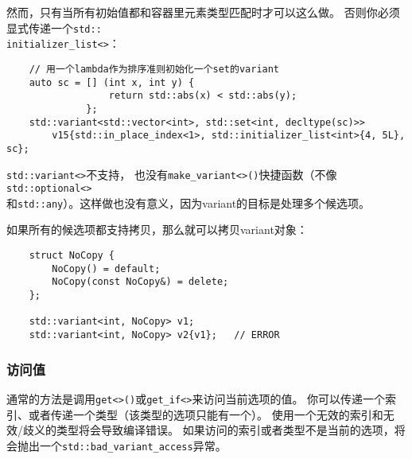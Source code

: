 然而，只有当所有初始值都和容器里元素类型匹配时才可以这么做。
否则你必须显式传递一个\texttt{std::\\
initializer\_list<>}：
\begin{lstlisting}
    // 用一个lambda作为排序准则初始化一个set的variant
    auto sc = [] (int x, int y) {
                  return std::abs(x) < std::abs(y);
              };
    std::variant<std::vector<int>, std::set<int, decltype(sc)>>
        v15{std::in_place_index<1>, std::initializer_list<int>{4, 5L}, sc};
\end{lstlisting}
\texttt{std::variant<>}不支持，
也没有\texttt{make\_variant<>()}快捷函数（不像\texttt{std::optional<>}\\
和\texttt{std::any}）。这样做也没有意义，因为variant的目标是处理多个候选项。

如果所有的候选项都支持拷贝，那么就可以拷贝variant对象：
\begin{lstlisting}
    struct NoCopy {
        NoCopy() = default;
        NoCopy(const NoCopy&) = delete;
    };

    std::variant<int, NoCopy> v1;
    std::variant<int, NoCopy> v2{v1};   // ERROR
\end{lstlisting}

\subsubsection{访问值}
通常的方法是调用\texttt{get<>()}或\texttt{get\_if<>}来访问当前选项的值。
你可以传递一个索引、或者传递一个类型（该类型的选项只能有一个）。
使用一个无效的索引和无效/歧义的类型将会导致编译错误。
如果访问的索引或者类型不是当前的选项，将会抛出一个\texttt{std::bad\_variant\_access}异常。

